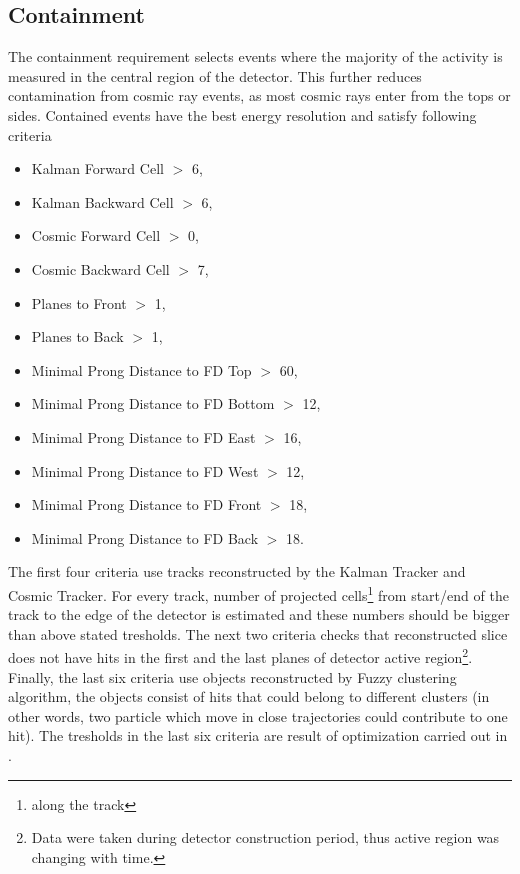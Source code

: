 \subsection{Containment} \label{Containment}
The containment requirement selects events where the majority of the activity is
measured in the central region of the detector. This further reduces contamination from cosmic 
ray events, as most cosmic rays enter from the tops or sides.  Contained events have the best 
energy resolution and satisfy following criteria

\begin{itemize}
\item Kalman Forward Cell $>$ 6,
\item Kalman Backward Cell $>$ 6,
\item Cosmic Forward Cell $>$ 0,
\item Cosmic Backward Cell $>$ 7,
\item Planes to Front $>$ 1,
\item Planes to Back $>$ 1,
\item Minimal Prong Distance to FD Top $>$ 60,
\item Minimal Prong Distance to FD Bottom $>$ 12,
\item Minimal Prong Distance to FD East $>$ 16,
\item Minimal Prong Distance to FD West $>$ 12,
\item Minimal Prong Distance to FD Front $>$ 18,
\item Minimal Prong Distance to FD Back $>$ 18.
\end{itemize}
The first four criteria use tracks reconstructed by the Kalman Tracker and Cosmic Tracker.
For every track, number of projected cells\footnote{along the track} from start/end of the track 
to the edge of the detector is estimated and these numbers should be bigger than above stated
tresholds. The next two criteria checks that reconstructed slice does not have hits in the first
and the last planes of detector active region\footnote{Data were taken during detector construction
period, thus active region was changing with time.}. Finally, the last six criteria use objects
reconstructed by Fuzzy clustering algorithm, the objects consist of hits that could belong to 
different clusters (in other words, two particle which move in close trajectories could contribute
to one hit). The tresholds in the last six criteria are result of optimization carried out in 
\cite{numucont_technote}.

